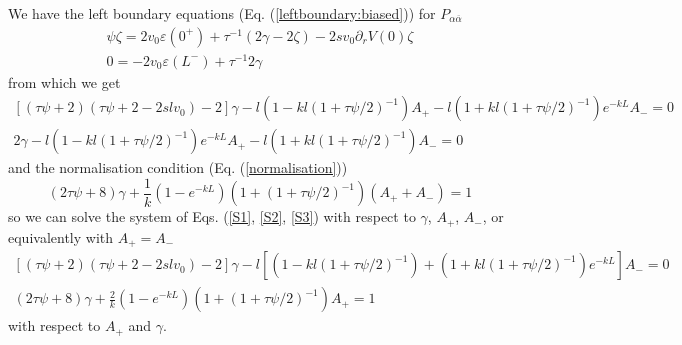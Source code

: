 \documentclass[pre,aps,superscriptaddress,nofootinbib]{revtex4}
\begin{document}
We have the left boundary equations (Eq. (\ref{leftboundary:biased})) for $P_{\alpha\overline{\alpha}}$
\begin{eqnarray}
\psi \zeta = 2 v_0 \varepsilon(0^+) + \tau^{-1} (2 \gamma - 2 \zeta) - 2 s v_0 \partial_r V(0) \zeta\\
0 = - 2 v_0 \varepsilon(L^-) + \tau^{-1} 2 \gamma
\end{eqnarray}
from which we get
\begin{eqnarray}
\label{S1}
\left[(\tau\psi + 2)(\tau\psi + 2 - 2 s l v_0) - 2\right] \gamma - l \left(1 - kl  (1 + \tau\psi/2)^{-1}\right) A_+ - l \left(1 + kl(1 + \tau\psi/2)^{-1}\right) e^{-kL} A_- = 0\\
\label{S2}
2 \gamma - l \left(1 - kl (1 + \tau\psi/2)^{-1}\right) e^{-kL} A_+ - l \left(1 + kl (1 + \tau\psi/2)^{-1}\right) A_- = 0
\end{eqnarray}
and the normalisation condition (Eq. (\ref{normalisation}))
\begin{equation}
(2 \tau \psi + 8) \gamma + \frac{1}{k} (1 - e^{-kL})(1 + (1 + \tau\psi/2)^{-1})(A_+ + A_-) = 1
\label{S3}
\end{equation}
so we can solve the system of Eqs. (\ref{S1}, \ref{S2}, \ref{S3}) with respect to $\gamma$, $A_+$, $A_-$, or equivalently with $A_+ = A_-$
\begin{eqnarray}
\label{S01}
\left[(\tau\psi + 2)(\tau\psi + 2 - 2 s l v_0) - 2\right] \gamma - l \left[\left(1 - kl  (1 + \tau\psi/2)^{-1}\right) + \left(1 + kl(1 + \tau\psi/2)^{-1}\right) e^{-kL}\right] A_- = 0\\
\label{S02}
(2 \tau \psi + 8) \gamma + \frac{2}{k} (1 - e^{-kL})(1 + (1 + \tau\psi/2)^{-1}) A_+ = 1
\end{eqnarray}
with respect to $A_+$ and $\gamma$.\\
\end{document}
